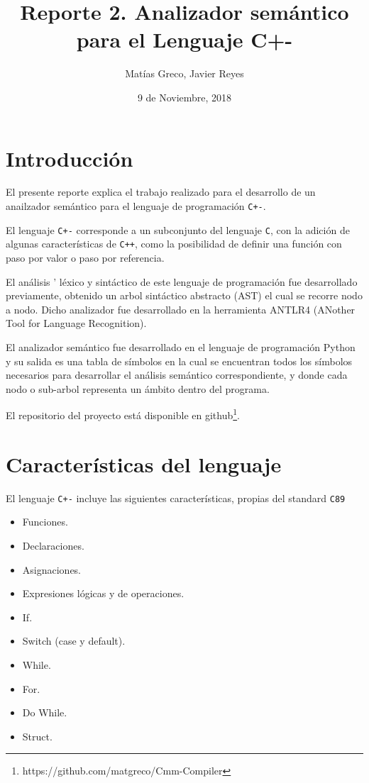 \documentclass[12pt]{article}
\newcommand{\Cp}{\texttt{C+-}}
\newcommand{\C}{\texttt{C}}
\newcommand{\Cpp}{\texttt{C++}}
\begin{document}

\title{Reporte 2. Analizador sem\'antico para el Lenguaje C+-}
\author{Mat\'ias Greco, Javier Reyes}
\date{9 de Noviembre, 2018}
\maketitle

\section*{Introducci\'on}
El presente reporte explica el trabajo realizado para el desarrollo de un anailzador sem\'antico para el lenguaje de programaci\'on \Cp.

El lenguaje \texttt{C+-} corresponde a un subconjunto del lenguaje \C, con la adici\'on de algunas caracter\'isticas de \Cpp, como la posibilidad de definir una funci\'on con paso por valor o paso por referencia.

El an\'alisis  ' l\'exico y sint\'actico de este lenguaje de programación fue desarrollado previamente, obtenido un arbol sintáctico abstracto (AST) el cual se recorre nodo a nodo. Dicho analizador fue desarrollado en la herramienta ANTLR4 (ANother Tool for Language Recognition). 

El analizador sem\'antico fue desarrollado en el lenguaje de programación Python y su salida es una tabla de s\'imbolos en la cual se encuentran todos los s\'imbolos necesarios para desarrollar el an\'alisis sem\'antico correspondiente, y donde cada nodo o sub-arbol representa un \'ambito dentro del programa.

El repositorio del proyecto está disponible en github\footnote{https://github.com/matgreco/Cmm-Compiler}.


\section*{Caracter\'isticas del lenguaje}

El lenguaje \texttt{C+-} incluye las siguientes caracter\'isticas, propias del standard \texttt{C89}
\begin{itemize}
    \item Funciones.
    \item Declaraciones.
    \item Asignaciones.
    \item Expresiones l\'ogicas y de operaciones.
    \item If.
    \item Switch (case y default).
    \item While.
    \item For.
    \item Do While.
    \item Struct.
\end{itemize}
\end{document}
